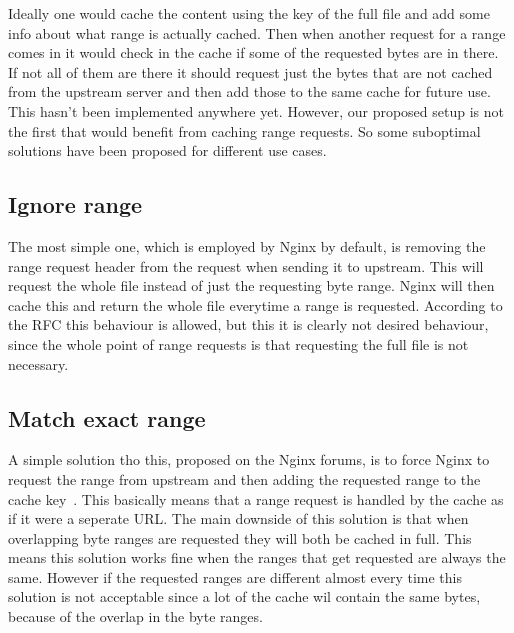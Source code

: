 \documentclass[twoside,openright]{uva-bachelor-thesis}
\begin{document}
Ideally one would cache the content using the key of the full file and add some
info about what range is actually cached. Then when another request for a range
comes in it would check in the cache if some of the requested bytes are in
there. If not all of them are there it should request just the bytes that are
not cached from the upstream server and then add those to the same cache for
future use. This hasn't been implemented anywhere yet. However, our proposed
setup is not the first that would benefit from caching range requests. So some
suboptimal solutions have been proposed for different use cases.

\subsection{Ignore range}
The most simple one, which is employed by Nginx by default,
is removing the range request header from the request when sending it to
upstream. This will request the whole file instead of just the requesting byte
range. Nginx will then cache this and return the whole file everytime a range is
requested. According to the RFC this behaviour is allowed, but this it is
clearly not desired behaviour, since the whole point of range requests is that
requesting the full file is not necessary.

\subsection{Match exact range}
A simple solution tho this, proposed on the Nginx forums, is to force Nginx to
request the range from upstream and then adding the requested range to the cache
key~\autocite{nginxcacheforum}. This basically means that a range request is
handled by the cache as if it were a seperate URL\@. The main downside of this
solution is that when overlapping byte ranges are requested they will both be
cached in full.  This means this  solution works fine when the ranges that get
requested are always the same. However if the requested ranges are different
almost every time this solution is not acceptable since a lot of the cache wil
contain the same bytes, because of the overlap in the byte ranges.

\end{document}
